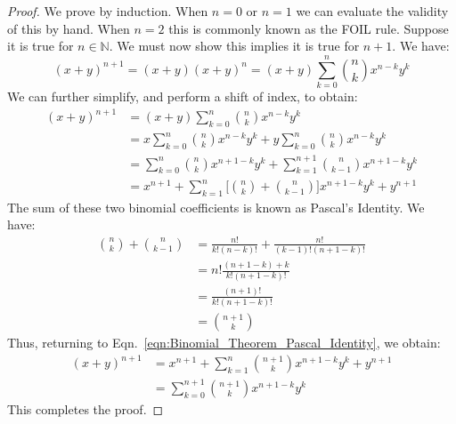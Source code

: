     \begin{proof}
        We prove by induction. When $n=0$ or $n=1$ we can evaluate the
        validity of this by hand. When $n=2$ this is commonly known
        as the FOIL rule. Suppose it is true for $n\in\mathbb{N}$. We must
        now show this implies it is true for $n+1$. We have:
        \begin{equation}
            (x+y)^{n+1}=(x+y)(x+y)^{n}
                       =(x+y)\sum_{k=0}^{n}\binom{n}{k}x^{n-k}y^{k}
        \end{equation}
        We can further simplify, and perform a shift of index, to obtain:
        \begin{subequations}
            \begin{align}
                (x+y)^{n+1}&=(x+y)\sum_{k=0}^{n}\binom{n}{k}x^{n-k}y^{k}\\
                           &=x\sum_{k=0}^{n}\binom{n}{k}x^{n-k}y^{k}
                            +y\sum_{k=0}^{n}\binom{n}{k}x^{n-k}y^{k}\\
                           &=\sum_{k=0}^{n}\binom{n}{k}x^{n+1-k}y^{k}
                            +\sum_{k=1}^{n+1}\binom{n}{k-1}
                                x^{n+1-k}y^{k}\\
                    \label{eqn:Binomial_Theorem_Pascal_Identity}%
                    &=x^{n+1}+\sum_{k=1}^{n}
                        \Big[\binom{n}{k}+\binom{n}{k-1}\Big]
                        x^{n+1-k}y^{k}+y^{n+1}
            \end{align}
        \end{subequations}
        The sum of these two binomial coefficients is known as
        Pascal's Identity. We have:
        \begin{subequations}
            \begin{align}
                \binom{n}{k}+\binom{n}{k-1}
                    &=\frac{n!}{k!(n-k)!}+\frac{n!}{(k-1)!(n+1-k)!}\\
                    &=n!\frac{(n+1-k)+k}{k!(n+1-k)!}\\
                    &=\frac{(n+1)!}{k!(n+1-k)!}\\
                    &=\binom{n+1}{k}
            \end{align}
        \end{subequations}
        Thus, returning to
        Eqn.~\ref{eqn:Binomial_Theorem_Pascal_Identity}, we obtain:
        \begin{subequations}
            \begin{align}
                (x+y)^{n+1}
                    &=x^{n+1}+\sum_{k=1}^{n}\binom{n+1}{k}x^{n+1-k}y^{k}
                     +y^{n+1}\\
                    &=\sum_{k=0}^{n+1}\binom{n+1}{k}x^{n+1-k}y^{k}
            \end{align}
        \end{subequations}
        This completes the proof.
    \end{proof}
